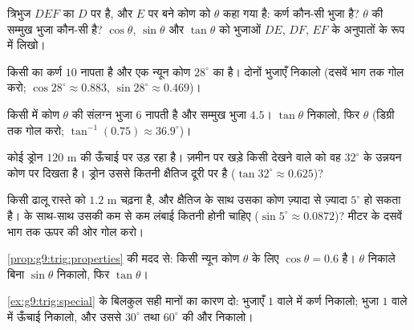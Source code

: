 \begin{exercise}[$\star$]\label{exo:g9:trig:3}
त्रिभुज $DEF$ का $D$ पर  है, और $E$ पर बने कोण को $\theta$ कहा
गया है: कर्ण कौन-सी भुजा है? $\theta$ की सम्मुख भुजा कौन-सी है?
$\cos\theta$, $\sin\theta$ और $\tan\theta$ को भुजाओं $DE$, $DF$, $EF$
के अनुपातों के रूप में लिखो।
\end{exercise}

\begin{exercise}[$\star$]\label{exo:g9:trig:4}
किसी  का कर्ण $10$ नापता है और एक न्यून कोण $28^\circ$
का है। दोनों  भुजाएँ निकालो (दसवें भाग तक गोल करो;
$\cos 28^\circ \approx 0.883$, $\sin 28^\circ \approx 0.469$)।
\end{exercise}

\begin{exercise}[$\star$]\label{exo:g9:trig:5}
किसी  में कोण $\theta$ की संलग्न भुजा $6$ नापती है और
सम्मुख भुजा $4.5$। $\tan\theta$ निकालो, फिर $\theta$ (डिग्री तक गोल
करो; $\tan^{-1}(0.75) \approx 36.9^\circ$)।
\end{exercise}

\begin{exercise}[$\star\star$]\label{exo:g9:trig:6}
कोई ड्रोन $120$ m की ऊँचाई पर उड़ रहा है। ज़मीन पर खड़े किसी देखने
वाले को वह $32^\circ$ के उन्नयन कोण पर दिखता है। ड्रोन उससे कितनी
क्षैतिज दूरी पर है ($\tan 32^\circ \approx 0.625$)?
\end{exercise}

\begin{exercise}[$\star\star$]\label{exo:g9:trig:7}
किसी ढालू रास्ते को $1.2$ m चढ़ना है, और क्षैतिज के साथ उसका कोण
ज़्यादा से ज़्यादा $5^\circ$ हो सकता है।  के साथ-साथ उसकी कम से कम
लंबाई कितनी होनी चाहिए ($\sin 5^\circ \approx 0.0872$)? मीटर के दसवें
भाग तक ऊपर की ओर गोल करो।
\end{exercise}

\begin{exercise}[$\star\star$]\label{exo:g9:trig:8}
\cref{prop:g9:trig:properties} की मदद से: किसी न्यून कोण $\theta$ के
लिए $\cos\theta = 0.6$ है। $\theta$ निकाले बिना $\sin\theta$ निकालो,
फिर $\tan\theta$।
\end{exercise}

\begin{exercise}[$\star\star\star$]\label{exo:g9:trig:9}
\cref{ex:g9:trig:special} के बिलकुल सही मानों का कारण दो: 
भुजाएँ $1$ वाले   में कर्ण निकालो; भुजा $1$
वाले  में ऊँचाई निकालो, और उससे $30^\circ$ तथा
$60^\circ$ की  और  निकालो।
\end{exercise}

